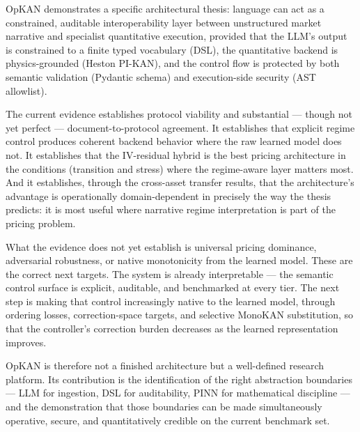 \documentclass[11pt,a4paper]{article}
\begin{document}
OpKAN demonstrates a specific architectural thesis: language can act as a constrained, auditable interoperability layer between unstructured market narrative and specialist quantitative execution, provided that the LLM's output is constrained to a finite typed vocabulary (DSL), the quantitative backend is physics-grounded (Heston PI-KAN), and the control flow is protected by both semantic validation (Pydantic schema) and execution-side security (AST allowlist).

The current evidence establishes protocol viability and substantial — though not yet perfect — document-to-protocol agreement. It establishes that explicit regime control produces coherent backend behavior where the raw learned model does not. It establishes that the IV-residual hybrid is the best pricing architecture in the conditions (transition and stress) where the regime-aware layer matters most. And it establishes, through the cross-asset transfer results, that the architecture's advantage is operationally domain-dependent in precisely the way the thesis predicts: it is most useful where narrative regime interpretation is part of the pricing problem.

What the evidence does not yet establish is universal pricing dominance, adversarial robustness, or native monotonicity from the learned model. These are the correct next targets. The system is already interpretable — the semantic control surface is explicit, auditable, and benchmarked at every tier. The next step is making that control increasingly native to the learned model, through ordering losses, correction-space targets, and selective MonoKAN substitution, so that the controller's correction burden decreases as the learned representation improves.

OpKAN is therefore not a finished architecture but a well-defined research platform. Its contribution is the identification of the right abstraction boundaries — LLM for ingestion, DSL for auditability, PINN for mathematical discipline — and the demonstration that those boundaries can be made simultaneously operative, secure, and quantitatively credible on the current benchmark set.



\end{document}

